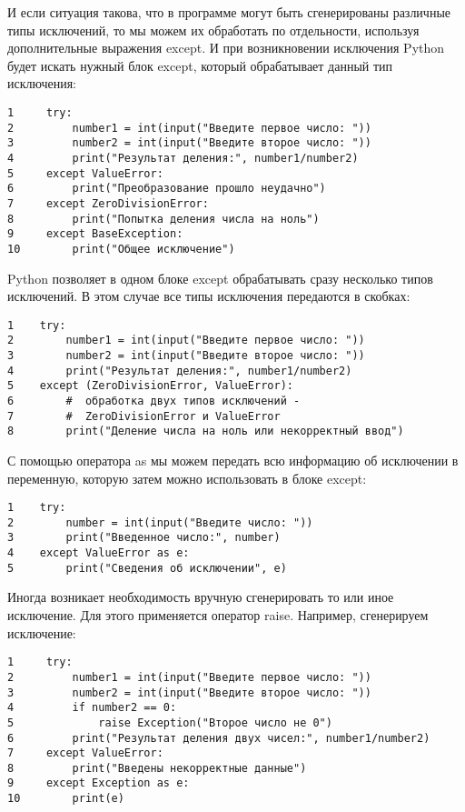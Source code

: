 \documentclass[12pt, a4paper]{article}
\begin{document}
И если ситуация такова, что в программе могут быть сгенерированы различные типы исключений, то мы можем их обработать по отдельности, используя дополнительные выражения except. И при возникновении исключения Python будет искать нужный блок except, который обрабатывает данный тип исключения:

\begin{verbatim}
1     try:
2         number1 = int(input("Введите первое число: "))
3         number2 = int(input("Введите второе число: "))
4         print("Результат деления:", number1/number2)
5     except ValueError:
6         print("Преобразование прошло неудачно")
7     except ZeroDivisionError:
8         print("Попытка деления числа на ноль")
9     except BaseException:
10        print("Общее исключение")
\end{verbatim}

Python позволяет в одном блоке except обрабатывать сразу несколько типов исключений. В этом случае все типы исключения передаются в скобках:

\begin{verbatim}
1    try:
2        number1 = int(input("Введите первое число: "))
3        number2 = int(input("Введите второе число: "))
4        print("Результат деления:", number1/number2)
5    except (ZeroDivisionError, ValueError):    
6        #  обработка двух типов исключений - 
7        #  ZeroDivisionError и ValueError
8        print("Деление числа на ноль или некорректный ввод")
\end{verbatim}

С помощью оператора as мы можем передать всю информацию об исключении в переменную, которую затем можно использовать в блоке except:

\begin{verbatim}
1    try:
2        number = int(input("Введите число: "))
3        print("Введенное число:", number)
4    except ValueError as e:
5        print("Сведения об исключении", e)
\end{verbatim}

Иногда возникает необходимость вручную сгенерировать то или иное исключение. Для этого применяется оператор raise. Например, сгенерируем исключение:

\begin{verbatim}
1     try:
2         number1 = int(input("Введите первое число: "))
3         number2 = int(input("Введите второе число: "))
4         if number2 == 0:
5             raise Exception("Второе число не 0")
6         print("Результат деления двух чисел:", number1/number2)
7     except ValueError:
8         print("Введены некорректные данные")
9     except Exception as e:
10        print(e)
\end{verbatim}
\end{document}

